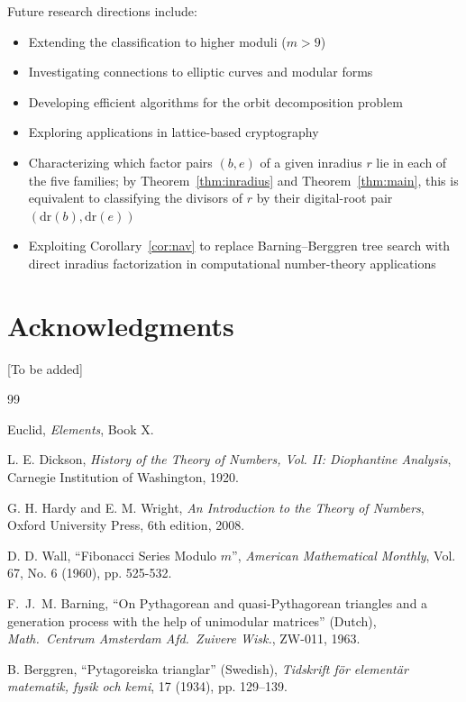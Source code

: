 \documentclass[12pt]{article}
\begin{document}
Future research directions include:
\begin{itemize}
\item Extending the classification to higher moduli ($m > 9$)
\item Investigating connections to elliptic curves and modular forms
\item Developing efficient algorithms for the orbit decomposition problem
\item Exploring applications in lattice-based cryptography
\item Characterizing which factor pairs $(b,e)$ of a given inradius $r$ lie in each of the five families; by Theorem~\ref{thm:inradius} and Theorem~\ref{thm:main}, this is equivalent to classifying the divisors of $r$ by their digital-root pair $(\mathrm{dr}(b), \mathrm{dr}(e))$
\item Exploiting Corollary~\ref{cor:nav} to replace Barning--Berggren tree search with direct inradius factorization in computational number-theory applications
\end{itemize}

\section*{Acknowledgments}

[To be added]

\begin{thebibliography}{99}

Euclid, \emph{Elements}, Book X.

L. E. Dickson, \emph{History of the Theory of Numbers, Vol. II: Diophantine Analysis}, Carnegie Institution of Washington, 1920.

G. H. Hardy and E. M. Wright, \emph{An Introduction to the Theory of Numbers}, Oxford University Press, 6th edition, 2008.

D. D. Wall, ``Fibonacci Series Modulo $m$'', \emph{American Mathematical Monthly}, Vol. 67, No. 6 (1960), pp. 525-532.

F.~J.~M. Barning, ``On Pythagorean and quasi-Pythagorean triangles and a generation process with the help of unimodular matrices'' (Dutch), \emph{Math.\ Centrum Amsterdam Afd.\ Zuivere Wisk.}, ZW-011, 1963.

B. Berggren, ``Pytagoreiska trianglar'' (Swedish), \emph{Tidskrift f{\"o}r element{\"a}r matematik, fysik och kemi}, 17 (1934), pp. 129--139.

\end{thebibliography}
\end{document}
